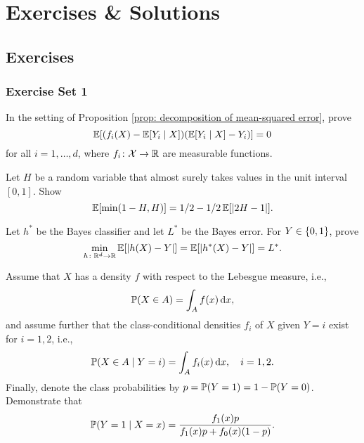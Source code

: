 \part{Exercises \& Solutions}

\chapter{Exercises}

\section{Exercise Set 1}

\begin{exercise}
In the setting of Proposition \ref{prop: decomposition of mean-squared error}, prove
\[
    \operatorname{\mathbb{E}}[(f_i(X) - \operatorname{\mathbb{E}}[Y_i \mathrel{|} X]) (\operatorname{\mathbb{E}}[Y_i \mathrel{|} X] - Y_i)] = 0
\]
for all $i = 1, \dots, d$, where $f_i \colon \mathcal{X} \to \mathbb{R}$ are measurable functions.
\end{exercise}


\begin{exercise}
Let $H$ be a random variable that almost surely takes values in the unit interval $[0, 1]$. Show
\[
    \operatorname{\mathbb{E}}[\min(1-H, H)] = 1/2 - 1/2 \operatorname{\mathbb{E}}[\abs{2H - 1}].
\]
\end{exercise}


\begin{exercise}
Let $h^*$ be the Bayes classifier and let $L^*$ be the Bayes error. For $Y \in \set{0, 1}$, prove
\[
    \min_{h \colon \mathbb{R}^d \to \mathbb{R}} \operatorname{\mathbb{E}}[\abs{h(X) - Y}] = \operatorname{\mathbb{E}}[\abs{h^*(X) - Y}] = L^*.
\]
\end{exercise}


\begin{exercise}
Assume that $X$ has a density $f$ with respect to the Lebesgue measure, i.e.,
\[
    \operatorname{\mathbb{P}}(X \in A) = \int_A f(x) \, \mathrm{d}x,
\]
and assume further that the class-conditional densities $f_i$ of $X$ given $Y = i$ exist for $i = 1, 2$, i.e.,
\[
    \operatorname{\mathbb{P}}(X \in A \mathrel{|} Y = i) = \int_A f_i(x) \, \mathrm{d}x, \quad i = 1, 2.
\]
Finally, denote the class probabilities by $p = \operatorname{\mathbb{P}}(Y = 1) = 1 - \operatorname{\mathbb{P}}(Y = 0)$. Demonstrate that
\[
    \operatorname{\mathbb{P}}(Y = 1 \mathrel{|} X = x) = \frac{f_1(x)p}{f_1(x)p + f_0(x) (1-p)}.
\]
\end{exercise}
